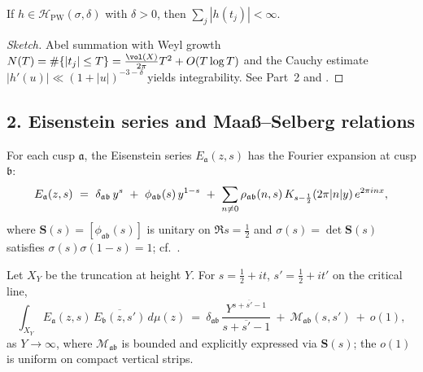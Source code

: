 \begin{lemma}\relax\hspace{0pt}
\label{lem:tfc5-absdisc} %
If $h\in\mathcal{H}_{\mathrm{PW}}(\sigma,\delta)$ with $\delta>0$, then $\sum_j |h(t_j)|<\infty$. \relax\hspace{0pt}
\end{lemma}

\begin{proof}[Sketch]\relax\hspace{0pt}
Abel summation with Weyl growth $N(T)=\#\{|t_j|\le T\}=\frac{\vol(X)}{2\pi}T^2+O(T\log T)$ and the Cauchy estimate $|h'(u)|\ll (1+|u|)^{-3-\delta}$ yields integrability. \relax\hspace{0pt}
See Part~2 and \cite{IwaniecSpectral,Borthwick}.\relax\hspace{0pt}
\end{proof}

\subsection*{2. Eisenstein series and Maaß--Selberg relations}\relax\hspace{0pt}
\label{subsec:tfc5-ms} %

For each cusp $\mathfrak{a}$, the Eisenstein series $E_{\mathfrak{a}}(z,s)$ has the Fourier expansion at cusp $\mathfrak{b}$:
\begin{equation}\relax\hspace{0pt}
\label{eq:tfc5-E-exp}\relax\hspace{0pt}
E_{\mathfrak{a}}(z,s)\ =\ \delta_{\mathfrak{a}\mathfrak{b}}\,y^{s}\ +\ \phi_{\mathfrak{a}\mathfrak{b}}(s)\,y^{1-s}\ +\ \sum_{n\neq 0}\rho_{\mathfrak{a}\mathfrak{b}}(n,s)\,K_{s-\frac12}(2\pi|n|y)\,e^{2\pi i n x},
\end{equation}
where $\mathbf{S}(s)=[\phi_{\mathfrak{a}\mathfrak{b}}(s)]$ is unitary on $\Re s=\tfrac12$ and $\sigma(s)=\det\mathbf{S}(s)$ satisfies $\sigma(s)\sigma(1-s)=1$; cf.\ \cite{HejhalII,LaxPhillips}. \relax\hspace{0pt}

\begin{theorem}\relax\hspace{0pt}
\label{thm:tfc5-MS} %
Let $X_Y$ be the truncation at height $Y$. For $s=\tfrac12+it$, $s'=\tfrac12+it'$ on the critical line,
\[
\int_{X_Y} E_{\mathfrak{a}}(z,s)\,\overline{E_{\mathfrak{b}}(z,s')}\,d\mu(z)\ =\ \delta_{\mathfrak{a}\mathfrak{b}}\,\frac{Y^{s+\overline{s'}-1}}{s+\overline{s'}-1}\ +\ \mathcal{M}_{\mathfrak{a}\mathfrak{b}}(s,s')\ +\ o(1),
\]
as $Y\to\infty$, where $\mathcal{M}_{\mathfrak{a}\mathfrak{b}}$ is bounded and explicitly expressed via $\mathbf{S}(s)$; the $o(1)$ is uniform on compact vertical strips. \relax\hspace{0pt}
\end{theorem}

